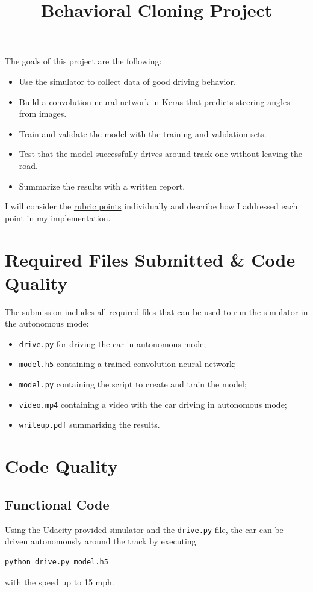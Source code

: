 \documentclass[a4paper,12pt]{article}
\title{Behavioral Cloning Project}
\begin{document}
\maketitle

The goals of this project are the following:
\begin{itemize}
  \item Use the simulator to collect data of good driving behavior.
  \item Build a convolution neural network in Keras that predicts steering angles from images.
  \item Train and validate the model with the training and validation sets.
  \item Test that the model successfully drives around track one without leaving the road.
  \item Summarize the results with a written report.
\end{itemize}

I will consider the \href{https://review.udacity.com/#!/rubrics/432/view}{rubric points} individually and describe how I addressed each point in my implementation.  

\section{Required Files Submitted \& Code Quality}

The submission includes all required files that can be used to run the simulator in the autonomous mode:
\begin{itemize}
  \item \texttt{drive.py} for driving the car in autonomous mode;
  \item \texttt{model.h5} containing a trained convolution neural network;
  \item \texttt{model.py} containing the script to create and train the model;
  \item \texttt{video.mp4} containing a video with the car driving in autonomous mode;
  \item \texttt{writeup.pdf} summarizing the results.
\end{itemize}

\section{Code Quality}

\subsection{Functional Code}
Using the Udacity provided simulator and the \texttt{drive.py} file, the car can be driven autonomously around the track by executing
\begin{verbatim}
python drive.py model.h5
\end{verbatim}
with the speed up to 15 mph.
\end{document}
